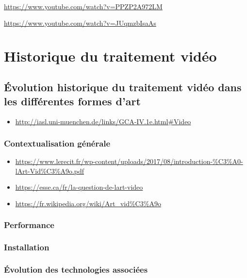 \documentclass[
]{book}
\providecommand{\tightlist}{%
  \setlength{\itemsep}{0pt}\setlength{\parskip}{0pt}}
\begin{document}
\url{https://www.youtube.com/watch?v=PPZP2A972LM}

\url{https://www.youtube.com/watch?v=JUqmzbIsaAs}

\hypertarget{historique}{%
\chapter{Historique du traitement vidéo}\label{historique}}

\hypertarget{evolution_historique}{%
\section{Évolution historique du traitement vidéo dans les différentes formes d'art}\label{evolution_historique}}

\begin{itemize}
\tightlist
\item
  \url{http://iasl.uni-muenchen.de/links/GCA-IV.1e.html\#Video}
\end{itemize}

\hypertarget{contextualisation-guxe9nuxe9rale}{%
\subsection{Contextualisation générale}\label{contextualisation-guxe9nuxe9rale}}

\begin{itemize}
\tightlist
\item
  \url{https://www.lerecit.fr/wp-content/uploads/2017/08/introduction-\%C3\%A0-lArt-Vid\%C3\%A9o.pdf}
\item
  \url{https://esse.ca/fr/la-question-de-lart-video}
\item
  \url{https://fr.wikipedia.org/wiki/Art_vid\%C3\%A9o}
\end{itemize}

\hypertarget{evolution_historique_performance}{%
\subsection{Performance}\label{evolution_historique_performance}}

\hypertarget{evolution_historique_installation}{%
\subsection{Installation}\label{evolution_historique_installation}}

\hypertarget{evolution_historique_technologies}{%
\subsection{Évolution des technologies associées}\label{evolution_historique_technologies}}
\end{document}
